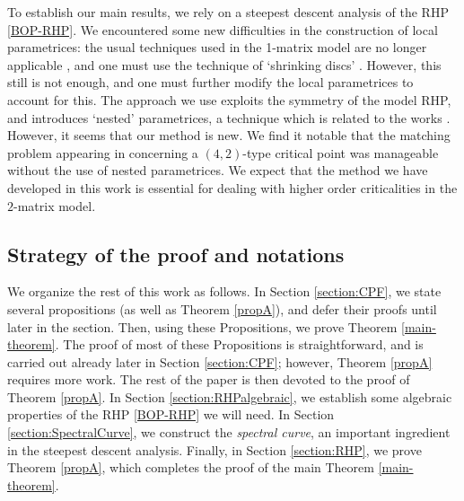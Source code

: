 \documentclass[usenames,dvipsnames]{article}
\theoremstyle{definition}
\numberwithin{equation}{section}
\numberwithin{figure}{section}
\begin{document}
    To establish our main results, we rely on a steepest descent analysis of the RHP \eqref{BOP-RHP}. We encountered some new difficulties in the construction of local parametrices: the usual techniques used in the 1-matrix model are no longer applicable \cite{DK0,BleherDeano}, and one must use the technique of `shrinking discs' \cite{DKZ,DG}. However, this still is not enough, and one must further modify the local parametrices to account for this. The approach we use exploits the symmetry of the model RHP, and introduces `nested' parametrices, a technique which is related to the works \cite{Molag0,Molag}. However, it seems that our method is new. We find it notable that the matching problem appearing in \cite{DG} concerning a $(4,2)$-type critical point was manageable without the use of nested parametrices. We expect that the method we have developed in this work is essential for dealing with higher order criticalities in the $2$-matrix model.

\subsection{Strategy of the proof and notations}
We organize the rest of this work as follows. In Section \ref{section:CPF}, we state several propositions (as well as Theorem \ref{propA}), and defer their proofs until later in the section. Then, using these Propositions, we prove Theorem \ref{main-theorem}. The proof of most of these Propositions is straightforward, and is carried out already later in Section \ref{section:CPF}; however, Theorem \ref{propA} requires more work. The rest of the paper is then devoted to the proof of Theorem \ref{propA}. In Section \ref{section:RHPalgebraic}, we establish some algebraic properties of the RHP \eqref{BOP-RHP} we will need. In Section \ref{section:SpectralCurve}, we construct the \textit{spectral curve}, an important ingredient in the steepest descent analysis. Finally, in Section \ref{section:RHP}, we prove Theorem \ref{propA}, which completes the proof of the main Theorem \ref{main-theorem}.
\end{document}

